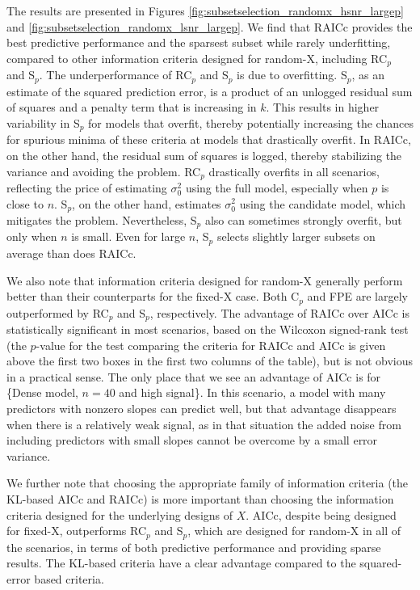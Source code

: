 The results are presented in Figures \ref{fig:subsetselection_randomx_hsnr_largep} and \ref{fig:subsetselection_randomx_lsnr_largep}. We find that RAICc provides the best predictive performance and the sparsest subset while rarely underfitting, compared to other information criteria designed for random-X, including RC$_p$ and S$_p$. The underperformance of RC$_p$ and S$_p$ is due to overfitting. S$_p$, as an estimate of the squared prediction error, is a product of an unlogged residual sum of squares and a penalty term that is increasing in $k$. This results in higher variability in S$_p$ for models that overfit, thereby potentially increasing the chances for spurious minima of these criteria at models that drastically overfit. In RAICc, on the other hand, the residual sum of squares is logged, thereby stabilizing the variance and avoiding the problem. RC$_p$ drastically overfits in all scenarios, reflecting the price of estimating $\sigma_0^2$ using the full model, especially when $p$ is close to $n$. S$_p$, on the other hand, estimates $\sigma_0^2$ using the candidate model, which mitigates the problem. Nevertheless, S$_p$ also can sometimes strongly overfit, but only when $n$ is small. Even for large $n$, S$_p$ selects slightly larger subsets on average than does RAICc. 

We also note that information criteria designed for random-X generally perform better than their counterparts for the fixed-X case. Both C$_p$ and FPE are largely outperformed by RC$_p$ and S$_p$, respectively. The advantage of RAICc over AICc is statistically significant in most scenarios, based on the Wilcoxon signed-rank test (the $p$-value for the test comparing the criteria for RAICc and AICc is given above the first two boxes in the first two columns of the table), but is not obvious in a practical sense. The only place that we see an advantage of AICc is for \{Dense model, $n=40$ and high signal\}. In this scenario, a model with many predictors with nonzero slopes can predict well, but that advantage disappears when there is a relatively weak signal, as in that situation the added noise from including predictors with small slopes cannot be overcome by a small error variance. 

We further note that choosing the appropriate family of information criteria (the KL-based AICc and RAICc) is more important than choosing the information criteria designed for the underlying designs of $X$. AICc, despite being designed for fixed-X, outperforms RC$_p$ and S$_p$, which are designed for random-X in all of the scenarios, in terms of both predictive performance and providing sparse results. The KL-based criteria have a clear advantage compared to the squared-error based criteria.

